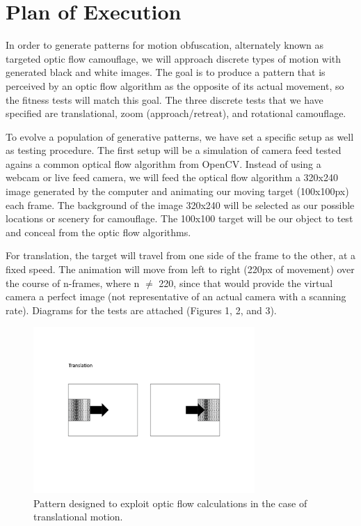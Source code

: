 \documentclass[12pt,letter]{article}
\begin{document}
\section{Plan of Execution}

 In order to generate patterns for motion obfuscation, alternately known as targeted optic flow camouflage, we will approach discrete types of motion with generated black and white images. The goal is to produce a pattern that is perceived by an optic flow algorithm as the opposite of its actual movement, so the fitness tests will match this goal. The three discrete tests that we have specified are translational, zoom (approach/retreat), and rotational camouflage. 

To evolve a population of generative patterns, we have set a specific setup as well as testing procedure. The first setup will be a simulation of camera feed tested agains a common optical flow algorithm from OpenCV. Instead of using a webcam or live feed camera, we will feed the optical flow algorithm a 320x240 image generated by the computer and animating our moving target (100x100px) each frame. The background of the image 320x240 will be selected as our possible locations or scenery for camouflage. The 100x100 target will be our object to test and conceal from the optic flow algorithms. 

For translation, the target will travel from one side of the frame to the other, at a fixed speed. The animation will move from left to right (220px of movement) over the course of n-frames, where n $\not=$ 220, since that would provide the virtual camera a perfect image (not representative of an actual camera with a scanning rate). Diagrams for the tests are attached (Figures 1, 2, and 3).

\begin{figure}[H]
    \centering
    \includegraphics[width=0.75\textwidth]{opticflow_diagrams-01.png}
    \caption{Pattern designed to exploit optic flow calculations in the case of translational motion.}
    \label{fig:lieflat}
\end{figure}
\end{document}
